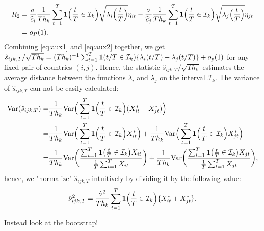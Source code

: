 \documentclass[a4paper,11pt]{article}
\numberwithin{equation}{section}
\begin{document}
\begin{align}\label{eq:aux2}
R_2& =  \frac{\sigma}{\widehat{c}_i} \frac{1}{Th_k} \sum\limits_{t=1}^T \boldsymbol{1}\Big(\frac{t}{T} \in \mathcal{I}_k\Big) \sqrt{\lambda_i\Big(\frac{t}{T}\Big)} \eta_{it} -\frac{\sigma}{\widehat{c}_j}\frac{1}{Th_k} \sum\limits_{t=1}^T \boldsymbol{1}\Big(\frac{t}{T} \in \mathcal{I}_k\Big)  \sqrt{\lambda_j\Big(\frac{t}{T}\Big)} \eta_{jt}\nonumber\\
& = o_P(1).
\end{align}
Combining \eqref{eq:aux1} and \eqref{eq:aux2} together, we get $\hat{s}_{ijk,T}/\sqrt{Th_k} = (Th_k)^{-1} \sum_{t=1}^T \boldsymbol{1}(t/T \in \mathcal{I}_k) \{\lambda_i(t/T) - \lambda_j(t/T)\} + o_p(1)$ for any fixed pair of countries $(i,j)$. Hence, the statistic $\hat{s}_{ijk,T}/\sqrt{Th_k}$ estimates the average distance between the functions $\lambda_i$ and $\lambda_j$ on the interval $\mathcal{I}_k$. The variance of $\hat{s}_{ijk,T}$ can not be easily calculated:
\begin{align*}
 \textnormal{Var}(\hat{s}_{ijk,T})  =&\frac{1}{Th_k} \textnormal{Var} \Big( \sum\limits_{t=1}^T \boldsymbol{1}\Big(\frac{t}{T} \in \mathcal{I}_k\Big) (X_{it}^* - X_{jt}^*) \Big)\\
=&\frac{1}{Th_k} \textnormal{Var} \Big( \sum\limits_{t=1}^T \boldsymbol{1}\Big(\frac{t}{T} \in \mathcal{I}_k\Big) X_{it}^*\Big) + \frac{1}{Th_k} \textnormal{Var} \Big( \sum\limits_{t=1}^T \boldsymbol{1}\Big(\frac{t}{T} \in \mathcal{I}_k\Big) X_{jt}^*\Big)\\
 = &\frac{1}{Th_k} \textnormal{Var} \bigg( \frac{\sum\nolimits_{t=1}^T \boldsymbol{1}\big(\frac{t}{T} \in \mathcal{I}_k\big) X_{it}}{\frac{1}{T}\sum\nolimits_{t=1}^T X_{it}} \bigg) + \frac{1}{Th_k} \textnormal{Var} \bigg( \frac{\sum\nolimits_{t=1}^T \boldsymbol{1}\big(\frac{t}{T} \in \mathcal{I}_k\big) X_{jt}}{\frac{1}{T}\sum\nolimits_{t=1}^T X_{jt}} \bigg),
\end{align*}
hence, we "normalize" $\hat{s}_{ijk,T}$ intuitively by dividing it by the following value:
\[ \hat{\nu}_{ijk,T}^2 = \frac{\hat{\sigma}^2}{Th_k} \sum\limits_{t=1}^T \boldsymbol{1}\Big(\frac{t}{T} \in \mathcal{I}_k\Big) \{ X^*_{it} + X^*_{jt} \}.\]

{\color{red} Instead look at the bootstrap!}
\end{document}
